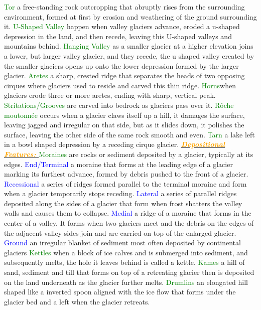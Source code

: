 \documentclass{article}
\newcommand{\green}[1]{\textcolor{green}{#1}}
\newcommand{\blue}[1]{\textcolor{blue}{#1}}
\newcommand{\orange}[1]{\textcolor{orange}{#1}}
\newcommand{\mysub}[1]{\underline{\textbf{{\textit{\orange{#1}}}}}}
\newcommand{\mysubsub}[1]{{{\green{#1}}}}
\newcommand{\mysubsubsub}[1]{{{\blue{#1}}}}
\begin{document}
\begin{multicols*}{4}
	 	    \mysubsub{Tor} a free-standing rock outcropping that abruptly rises from the surrounding environment, formed at first by erosion and weathering of the ground surrounding it.
	 	    \mysubsub{U-Shaped Valley} happen when valley glaciers advance, eroded a u-shaped depression in the land, and then recede, leaving this U-shaped valleys and mountains behind.
	 	    \mysubsub{Hanging Valley} as a smaller glacier at a higher elevation joins a lower, but larger valley glacier, and they recede, the u shaped valley created by the smaller glaciers opens up onto the lower depression formed by the larger glacier.
	 	    \mysubsub{Aretes} a sharp, crested ridge that separates the heads of two opposing cirques where glaciers used to reside and carved this thin ridge.
	 	    \mysubsub{Horns}when glaciers erode three or more aretes, ending with sharp, vertical peak.
	 	    \mysubsub{Stritations/Grooves} are carved into bedrock as glaciers pass over it.
	 	    \mysubsub{Rôche moutonnée} occurs when a glacier claws itself up a hill, it damages the surface, leaving jagged and irregular on that side, but as it slides down, it polishes the surface, leaving the other side of the same rock smooth and even.
	 	    \mysubsub{Tarn} a lake left in a bowl shaped depression by a receding cirque glacier.
	 	    \mysub{Depositional Features: }
			\mysubsub{Moraines} are rocks or sediment deposited by a glacier, typically at its edges.
			\mysubsubsub{End/Terminal} a moraine that forms at the leading edge of a glacier marking its furthest advance, formed by debris pushed to the front of a glacier.
			\mysubsubsub{Recessional} a series of ridges formed parallel to the terminal moraine and form when a glacier temporarily stops receding.
			\mysubsubsub{Lateral} a series of parallel ridges deposited along the sides of a glacier that form when frost shatters the valley walls and causes them to collapse.
			\mysubsubsub{Medial}  a ridge of a moraine that forms in the center of a valley. It forms when two glaciers meet and the debris on the edges of the adjacent valley sides join and are carried on top of the enlarged glacier.
			\mysubsubsub{Ground} an irregular blanket of sediment most often deposited by continental glaciers
			\mysubsub{Kettles} when a block of ice calves and is submerged into sediment, and subsequently melts, the hole it leaves behind is called a kettle.
			\mysubsub{Kames} a hill of sand, sediment and till that forms on top of a retreating glacier then is deposited on the land underneath as the glacier further melts.
			\mysubsub{Drumlins} an elongated hill shaped like a inverted spoon aligned with the ice flow that forms under the glacier bed and a left when the glacier retreats.

\end{multicols*}
\end{document}
